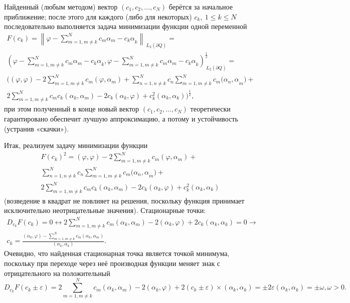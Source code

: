 ﻿\documentclass[a4paper, 12pt]{article}
\begin{document}
Найденный (любым методом) вектор $\left(c_1,c_2,\dots ,c_N\right)$ берётся за начальное приближение; после этого для каждого (либо для некоторых) $c_k,\ 1\le k\le N$ последовательно выполняется задача минимизации функции одной переменной
\begin{multline}
F\left(c_k\right)={\left\|\varphi -\sum^N_{m=1,m\neq k}{c_m}{\alpha }_m-{c_k\alpha }_k\right\|}_{{\ L}_2\left(\partial Q\right)}=\\
{\left(\varphi -\sum^N_{m=1,m\neq k}{c_m}{\alpha }_m-{c_k\alpha }_k,\varphi -\sum^N_{m=1,m\neq k}{c_m}{\alpha }_m-{c_k\alpha }_k\right)}^{\frac{1}{2}}_{{\ L}_2\left(\partial Q\right)}=\\
\Biggl(\left(\varphi ,\varphi \right)-2\sum^N_{m=1,m\neq k}{c_m}\left(\varphi ,{\alpha }_m\right)+\sum^N_{n=1,n\neq k}{c_n}\sum^N_{m=1,m\neq k}{c_m}{({\alpha }_n,\alpha }_m)+ \\
2\sum^N_{m=1,m\neq k}{c_m}c_k\left({\alpha }_k,{\alpha }_m\right)-2c_k\left({\alpha }_k,\varphi \right)+c^2_k\left({\alpha }_k,{\alpha }_k\right)\Biggl)^{\frac{1}{2}},
\end{multline} 
при этом полученный в конце новый вектор $\left(c_1,c_2,\dots ,c_N\right)$ теоретически гарантировано обеспечит лучшую аппроксимацию, а потому и устойчивость (устранив «скачки»).

Итак, реализуем задачу минимизации функции
\begin{multline}{F\left(c_k\right)}^2=\left(\varphi ,\varphi \right)-2\sum^N_{m=1,m\neq k}{c_m}\left(\varphi ,{\alpha }_m\right)+\\
\sum^N_{n=1,n\neq k}{c_n}\sum^N_{m=1,m\neq k}{c_m}{({\alpha }_n,\alpha }_m)+\\
2\sum^N_{m=1,m\neq k}{c_m}c_k\left({\alpha }_k,{\alpha }_m\right)-2c_k\left({\alpha }_k,\varphi \right)+c^2_k\left({\alpha }_k,{\alpha }_k\right)\end{multline} 
(возведение в квадрат не повлияет на решения, поскольку функция принимает исключительно неотрицательные значения). Стационарные точки:
\begin{multline}D_{c_k}F\left(c_k\right)=0\leftrightarrow 2\sum^N_{m=1,m\neq k}{c_m}\left({\alpha }_k,{\alpha }_m\right)-2\left({\alpha }_k,\varphi \right)+2c_k\left({\alpha }_k,{\alpha }_k\right)=0\to\\
c_k=\frac{\left({\alpha }_k,\varphi \right)-\sum^N_{m=1,m\neq k}{c_m}\left({\alpha }_k,{\alpha }_m\right)}{\left({\alpha }_k,{\alpha }_k\right)}.\end{multline} 
Очевидно, что найденная стационарная точка является точкой минимума, поскольку при переходе через неё производная функции меняет знак с отрицательного на положительный
\begin{equation}D_{c_k}F\left(c_k\pm \varepsilon \right)=2\sum^N_{m=1,m\neq k}{c_m}\left({\alpha }_k,{\alpha }_m\right)-2\left({\alpha }_k,\varphi \right)+2\left(c_k\pm \varepsilon \right)\times \left({\alpha }_k,{\alpha }_k\right)=\pm 2\varepsilon \left({\alpha }_k,{\alpha }_k\right)=\pm \omega ,\omega >0.\end{equation} 
\end{document}
